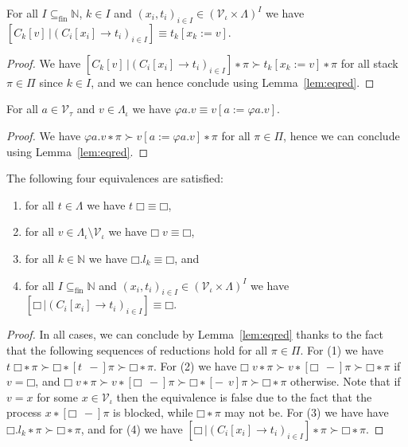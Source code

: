 \begin{theorem}
  For all $I ⊆_{\text{fin}} \mathbb{N}$, $k ∈ I$ and $(x_i, t_i)_{i ∈ I} ∈
  (\mathcal{V}_{ι} × Λ)^I$ we have  $[C_k[v]\,| (C_i[x_i] → t_i)_{i∈I}] ≡
  t_k[x_k := v]$.
\end{theorem}
\begin{proof}
  We have ${[C_k[v]\,| (C_i[x_i] → t_i)_{i∈I}] ∗ π} ≻ {t_k[x_k := v] ∗ π}$
  for all stack $π ∈ Π$ since $k ∈ I$, and we can hence conclude using
  Lemma~\ref{lem:eqred}.
\end{proof}

\begin{theorem}
  For all $a ∈ \mathcal{V}_{τ}$ and $v ∈ Λ_{ι}$ we have
  ${φa.v} ≡ {v[a := φa.v]}$.
\end{theorem}
\begin{proof}
  We have ${φa.v ∗ π} ≻ {v[a := φa.v] ∗ π}$ for all $π ∈ Π$, hence we can
  conclude using Lemma~\ref{lem:eqred}.
\end{proof}

\begin{theorem}
  The following four equivalences are satisfied:
  \begin{enumerate}
    \item for all $t ∈ Λ$ we have $t\;□ ≡ □$,
    \item for all $v ∈ Λ_{ι} \setminus \mathcal{V}_{ι}$ we have $□\;v ≡ □$,
    \item for all $k ∈ \mathbb{N}$ we have $□.l_k ≡ □$, and
    \item for all $I ⊆_\text{fin} \mathbb{N}$ and
          $(x_i, t_i)_{i∈I} ∈ (\mathcal{V}_{ι} × Λ)^I$
          we have $[□\,| (C_i[x_i] → t_i)_{i∈I}] ≡ □$.
  \end{enumerate}
\end{theorem}
\begin{proof}
  In all cases, we can conclude by Lemma~\ref{lem:eqred} thanks to the fact
  that the following sequences of reductions hold for all $π ∈ Π$.
  For (1) we have ${t\;□ ∗ π} ≻ {□ ∗ [t\;\,{-}]π} ≻ {□ ∗ π}$.
  For (2) we have ${□\;v ∗ π} ≻ {v ∗ [□\;\,{-}]π} ≻ {□ ∗ π}$ if $v = □$, and
  ${□\;v ∗ π} ≻ {v ∗ [□\;\,{-}]π} ≻ {□ ∗ [{-}\;\,v]π} ≻ {□ ∗ π}$ otherwise.
  Note that if $v = x$ for some $x ∈ \mathcal{V}_{ι}$ then the equivalence is
  false due to the fact that the process ${x ∗ [□\;\,{-}]π}$ is blocked,
  while ${□ ∗ π}$ may not be.
  For (3) we have have ${□.l_k ∗ π} ≻ {□ ∗ π}$,
  and for (4) we have ${[□\,| (C_i[x_i] → t_i)_{i∈I}] ∗ π} ≻ {□ ∗ π}$.
\end{proof}

